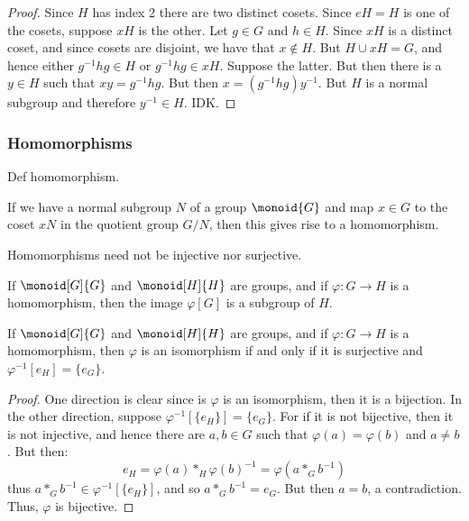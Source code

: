             \begin{proof}
                Since $H$ has index 2 there are two distinct cosets. Since
                $eH=H$ is one of the cosets, suppose $xH$ is the other.
                Let $g\in{G}$ and $h\in{H}$. Since $xH$ is a distinct coset,
                and since cosets are disjoint, we have that $x\notin{H}$.
                But $H\cup{x}H=G$, and hence either $g^{\minus{1}}hg\in{H}$
                or $g^{\minus{1}}hg\in{x}H$. Suppose the latter. But then
                there is a $y\in{H}$ such that $xy=g^{\minus{1}}hg$.
                But then $x=(g^{\minus{1}}hg)y^{\minus{1}}$. But $H$ is a
                normal subgroup and therefore $y^{\minus{1}}\in{H}$. IDK.
            \end{proof}
        \subsubsection{Homomorphisms}
            Def homomorphism.
            \begin{example}
                If we have a normal subgroup $N$ of a group $\monoid{G}$ and
                map $x\in{G}$ to the coset $xN$ in the quotient group
                $G/N$, then this gives rise to a homomorphism.
            \end{example}
            Homomorphisms need not be injective nor surjective.
            \begin{theorem}
                If $\monoid[G]{G}$ and $\monoid[H]{H}$ are groups, and if
                $\varphi:G\rightarrow{H}$ is a homomorphism, then
                the image $\varphi[G]$ is a subgroup of $H$.
            \end{theorem}
            \begin{theorem}
                If $\monoid[G]{G}$ and $\monoid[H]{H}$ are groups, and if
                $\varphi:G\rightarrow{H}$ is a homomorphism, then $\varphi$
                is an isomorphism if and only if it is surjective and
                $\varphi^{\minus{1}}[e_{H}]=\{e_{G}\}$.
            \end{theorem}
            \begin{proof}
                One direction is clear since is $\varphi$ is an isomorphism,
                then it is a bijection. In the other direction, suppose
                $\varphi^{\minus{1}}[\{e_{H}\}]=\{e_{G}\}$. For if it is not
                bijective, then it is not injective, and hence there are
                $a,b\in{G}$ such that $\varphi(a)=\varphi(b)$ and $a\ne{b}$.
                But then:
                \begin{equation}
                    e_{H}=\varphi(a)*_{H}\varphi(b)^{\minus{1}}
                         =\varphi(a*_{G}b^{\minus{1}})
                \end{equation}
                thus $a*_{G}b^{\minus{1}}\in\varphi^{\minus{1}}[\{e_{H}\}]$,
                and so $a*_{G}b^{\minus{1}}=e_{G}$. But then $a=b$, a
                contradiction. Thus, $\varphi$ is bijective.
            \end{proof}
